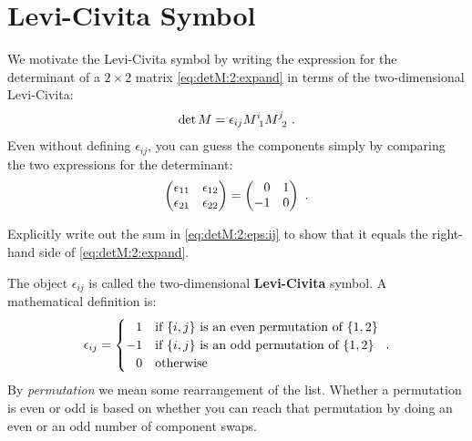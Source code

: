 \documentclass[12pt, oneside]{report}    %
\let\oldsection\section
\def\section{%
  \setcounter{sidenote}{1}%
  \oldsection
}
\begin{document}
\section{Levi-Civita Symbol}

We motivate the Levi-Civita symbol by writing the expression for the determinant of a $2\times 2$ matrix \eqref{eq:detM:2:expand} in terms of the two-dimensional Levi-Civita:
\begin{align}
    \det M = \epsilon_{ij}M\aij{i}{1} M\aij{j}{2} \ .
    \label{eq:detM:2:eps:ij}
\end{align}
Even without defining $\epsilon_{ij}$, you can guess the components simply by comparing the two expressions for the determinant:
\begin{align}
    \begin{pmatrix}
        \epsilon_{11} & \epsilon_{12} \\
        \epsilon_{21} & \epsilon_{22} 
    \end{pmatrix}
    =
    \begin{pmatrix}
        \pp 0 & 1 \\
        -1 & 0
    \end{pmatrix} \ .
\end{align}
% 
\begin{exercise}
Explicitly write out the sum in \eqref{eq:detM:2:eps:ij} to show that it equals the right-hand side of \eqref{eq:detM:2:expand}.
\end{exercise}
% 
The object $\epsilon_{ij}$ is called the two-dimensional \textbf{Levi-Civita} symbol. A mathematical definition is:
\begin{align}
    \epsilon_{ij} = 
    \begin{cases}
    \pp 1 &\text{if }\{i,j\}\text{ is an even permutation of }\{1,2\}\\
    -1 &\text{if }\{i,j\}\text{ is an odd permutation of }\{1,2\}\\
    \pp 0 &\text{otherwise}
    \end{cases}
    \ .
\end{align}
By \emph{permutation} we mean some rearrangement of the list. Whether a permutation is even or odd is based on whether you can reach that permutation by doing an even or an odd number of component swaps.
\end{document}
